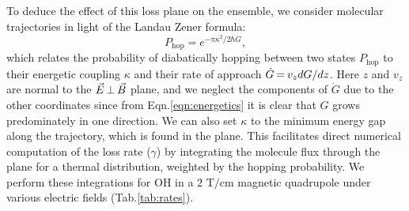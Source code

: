 \documentclass[%
 reprint,
 amsmath,amssymb,
 aps,
prl,
]{revtex4-1}
\newcommand{\epb}{{$\vec{E}\s {\perp}\s\vec{B}$}}
\newcommand{\s}{{\nobreak\hspace{.2em}}}
\begin{document}
To deduce the effect of this loss plane on the ensemble, we consider molecular trajectories in light of the Landau Zener formula:
\begin{equation}
\label{eqn:lz}
P_\text{hop}=e^{-\pi\kappa^2/2\hbar\dot{G}},
\end{equation}
which relates the probability of diabatically hopping between two states $P_\text{hop}$ to their energetic coupling $\kappa$ and their rate of approach $\dot{G}\s {=}\s v_zdG/dz$.
Here $z$ and $v_z$ are normal to the \epb{} plane, and we neglect the components of $\dot{G}$ due to the other coordinates since from Eqn.\s\ref{eqn:energetics} it is clear that $G$ grows predominately in one direction.
We can also set $\kappa$ to the minimum energy gap along the trajectory, which is found in the plane.
This facilitates direct numerical computation of the loss rate ($\gamma$) by integrating the molecule flux through the plane for a thermal distribution, weighted by the hopping probability.
We perform these integrations for OH in a $2\text{ T/cm}$ magnetic quadrupole\s\cite{Sawyer2008} under various electric fields (Tab.\s\ref{tab:rates}).
\end{document}
